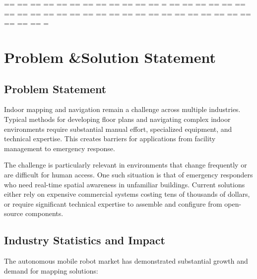     == == == == == == == == == == == ==
    = %
      == == == == == == == == == == == == == == == == == == == == == == == == ==
      == == ==
    =

\section {
  Problem \&Solution Statement
}

\subsection{Problem Statement}


Indoor mapping and navigation remain a challenge across multiple industries. Typical methods for developing floor plans and navigating complex indoor environments require substantial manual effort, specialized equipment, and technical expertise. This creates barriers for applications from facility management to emergency response.

The challenge is particularly relevant in environments that change frequently or are difficult for human access. One such situation is that of emergency responders who need real-time spatial awareness in unfamiliar buildings. Current solutions either rely on expensive commercial systems costing tens of thousands of dollars, or require significant technical expertise to assemble and configure from open-source components.

\subsection{Industry Statistics and Impact}

The autonomous mobile robot market has demonstrated substantial growth and demand for mapping solutions:

